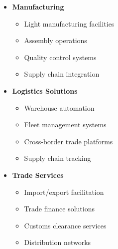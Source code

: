 \begin{tcolorbox}[colback=white,colframe=primarydark,title=\textbf{Industrial and Trade Growth Areas}]
\begin{itemize}
    \item \textbf{Manufacturing}
    \begin{itemize}
        \item Light manufacturing facilities
        \item Assembly operations
        \item Quality control systems
        \item Supply chain integration
    \end{itemize}

    \item \textbf{Logistics Solutions}
    \begin{itemize}
        \item Warehouse automation
        \item Fleet management systems
        \item Cross-border trade platforms
        \item Supply chain tracking
    \end{itemize}

    \item \textbf{Trade Services}
    \begin{itemize}
        \item Import/export facilitation
        \item Trade finance solutions
        \item Customs clearance services
        \item Distribution networks
    \end{itemize}
\end{itemize}
\end{tcolorbox}

%
%

